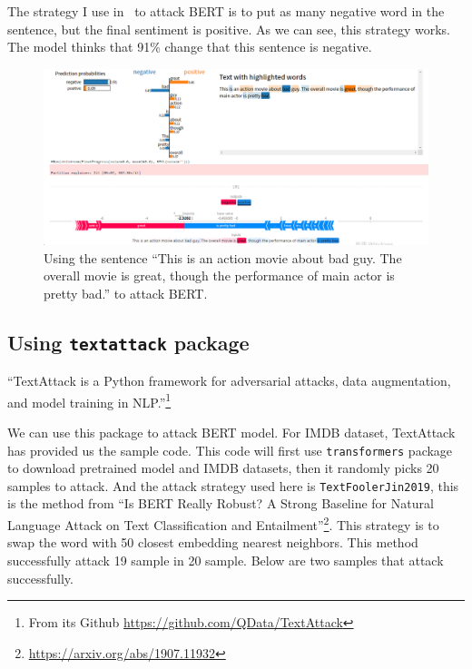 \documentclass{article}[12pt]
\begin{document}
The strategy I use in \ to attack BERT is to put as many negative word in the sentence, but the final sentiment is positive. As we can see, this strategy works. The model thinks that 91\% change that this sentence is negative.

\begin{figure}[htbp]
	\centering
	\includegraphics[width=\linewidth]{figure/attack-8}
	\caption{Using the sentence ``This is an action movie about bad guy. The overall movie is great, though the performance of main actor is pretty bad.'' to attack BERT.}
	\label{fig:attack-8}
\end{figure}


\subsection{Using \texttt{textattack} package}

``TextAttack is a Python framework for adversarial attacks, data augmentation, and model training in NLP.''\footnote{From its Github \url{https://github.com/QData/TextAttack}}

We can use this package to attack BERT model. For IMDB dataset, TextAttack has provided us the sample code. This code will first use \texttt{transformers} package to download pretrained model and IMDB datasets, then it randomly picks 20 samples to attack. And the attack strategy used here is \texttt{TextFoolerJin2019}, this is the method from ``Is BERT Really Robust? A Strong Baseline for Natural Language Attack on Text Classification and Entailment''\footnote{\url{https://arxiv.org/abs/1907.11932}}. This strategy is to swap the word with 50 closest embedding nearest neighbors. This method successfully attack 19 sample in 20 sample. Below are two samples that attack successfully.
\end{document}

